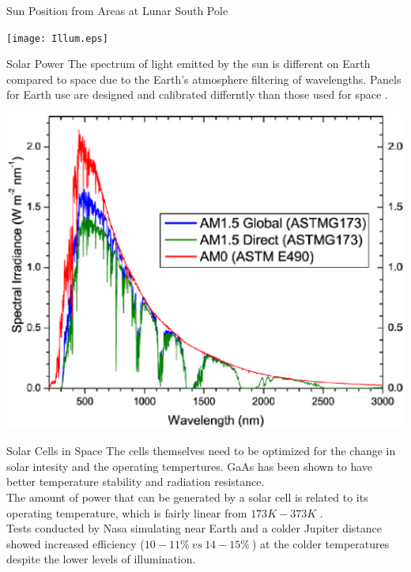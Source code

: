 \documentclass{beamer}
\begin{document}
\begin{frame}{Sun Position from Areas at Lunar South Pole}


 \begin{center}
             \texttt{[image: Illum.eps]}   
      \end{center}  

\end{frame}

\begin{frame}{Solar Power}
The spectrum of light emitted by the sun is different on Earth compared to space due to the Earth's atmosphere filtering of  wavelengths. Panels for Earth use are designed and calibrated differntly than those used for space\cite{Liebert} \cite{Mcevoy}.  
 \begin{center}
             \includegraphics[width=.68\textwidth]{AM0.eps}   
      \end{center}  

\end{frame}

\begin{frame}{Solar Cells in Space}
The cells themselves need to be optimized for the change in solar intesity and the operating tempertures. GaAs has been shown to have better temperature stability and radiation resistance\cite{Mcevoy}.\\
The amount of power that can be generated by a solar cell is related to its operating temperature, which is fairly linear from $173 K - 373K$ \cite{Mcevoy}.\\ Tests conducted by Nasa simulating near Earth and a colder Jupiter distance showed increased efficiency ($  10-11\%\ vs\ 14-15\%\ $) at the colder temperatures despite the lower levels of illumination\cite{Liebert}.
\end{frame}
\end{document}
